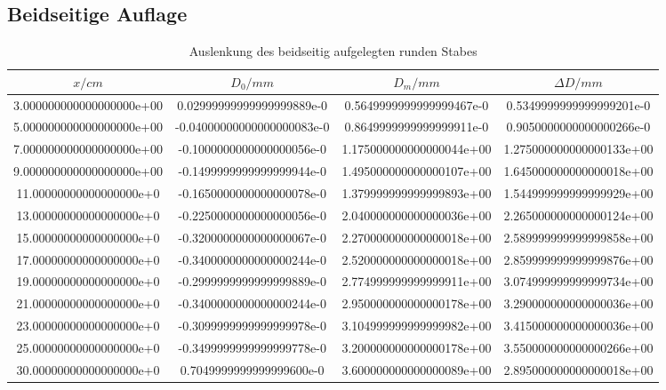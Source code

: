 \subsection{Beidseitige Auflage}
\label{sec:Beidseitig}

\begin{table}
  \centering
  \caption{Auslenkung des beidseitig aufgelegten runden Stabes}
  \label{tab:Erb}
  \begin{tabular}{S S S S}
    \toprule
    {$x/cm$} & {$D_0 /mm$} & {$D_m / mm$} & {$\Delta D /mm$}\\
    \midrule
    3.000000000000000000e+00 & 0.02999999999999999889e-0 & 0.5649999999999999467e-0 & 0.5349999999999999201e-0\\
    5.000000000000000000e+00 & -0.04000000000000000083e-0 & 0.8649999999999999911e-0 & 0.9050000000000000266e-0\\
    7.000000000000000000e+00 & -0.1000000000000000056e-0 & 1.175000000000000044e+00 & 1.275000000000000133e+00\\
    9.000000000000000000e+00 & -0.1499999999999999944e-0 & 1.495000000000000107e+00 & 1.645000000000000018e+00\\
    11.00000000000000000e+0 & -0.1650000000000000078e-0 & 1.379999999999999893e+00 & 1.544999999999999929e+00\\
    13.00000000000000000e+0 & -0.2250000000000000056e-0 & 2.040000000000000036e+00 & 2.265000000000000124e+00\\
    15.00000000000000000e+0 & -0.3200000000000000067e-0 & 2.270000000000000018e+00 & 2.589999999999999858e+00\\
    17.00000000000000000e+0 & -0.3400000000000000244e-0 & 2.520000000000000018e+00 & 2.859999999999999876e+00\\
    19.00000000000000000e+0 & -0.2999999999999999889e-0 & 2.774999999999999911e+00 & 3.074999999999999734e+00\\
    21.00000000000000000e+0 & -0.3400000000000000244e-0 & 2.950000000000000178e+00 & 3.290000000000000036e+00\\
    23.00000000000000000e+0 & -0.3099999999999999978e-0 & 3.104999999999999982e+00 & 3.415000000000000036e+00\\
    25.00000000000000000e+0 & -0.3499999999999999778e-0 & 3.200000000000000178e+00 & 3.550000000000000266e+00\\
    30.00000000000000000e+0 & 0.7049999999999999600e-0 & 3.600000000000000089e+00 & 2.895000000000000018e+00\\

\end{tabular}
\end{table}
